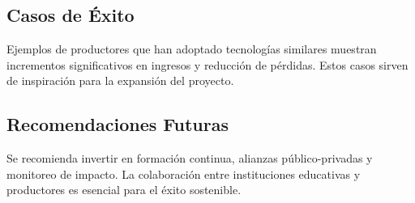 \documentclass[conference]{IEEEtran}
\begin{document}
\subsection{Casos de Éxito}
Ejemplos de productores que han adoptado tecnologías similares muestran incrementos significativos en ingresos y reducción de pérdidas. Estos casos sirven de inspiración para la expansión del proyecto.

\subsection{Recomendaciones Futuras}
Se recomienda invertir en formación continua, alianzas público-privadas y monitoreo de impacto. La colaboración entre instituciones educativas y productores es esencial para el éxito sostenible.

\printbibliography
\end{document}

